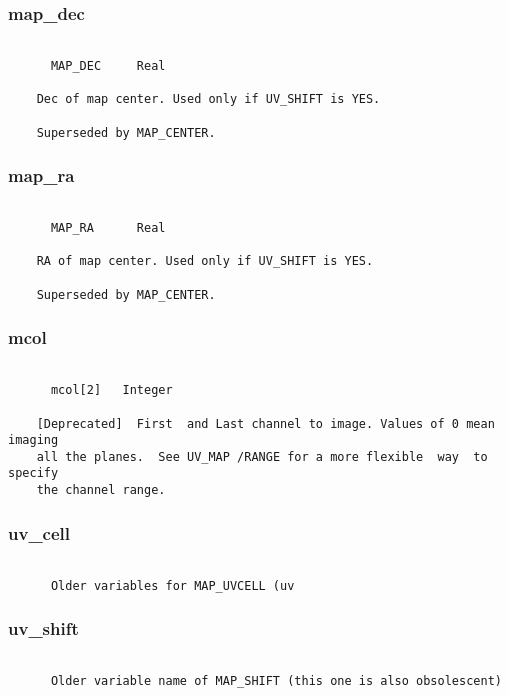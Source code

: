 \subsubsection{map\_dec}
\begin{verbatim}

      MAP_DEC     Real

    Dec of map center. Used only if UV_SHIFT is YES.

    Superseded by MAP_CENTER.

\end{verbatim}
\subsubsection{map\_ra}
\begin{verbatim}

      MAP_RA      Real

    RA of map center. Used only if UV_SHIFT is YES.

    Superseded by MAP_CENTER.

\end{verbatim}
\subsubsection{mcol}
\begin{verbatim}

      mcol[2]   Integer

    [Deprecated]  First  and Last channel to image. Values of 0 mean imaging
    all the planes.  See UV_MAP /RANGE for a more flexible  way  to  specify
    the channel range.

\end{verbatim}
\subsubsection{uv\_cell}
\begin{verbatim}

      Older variables for MAP_UVCELL (uv
\end{verbatim}
\subsubsection{uv\_shift}
\begin{verbatim}

      Older variable name of MAP_SHIFT (this one is also obsolescent)

\end{verbatim}
